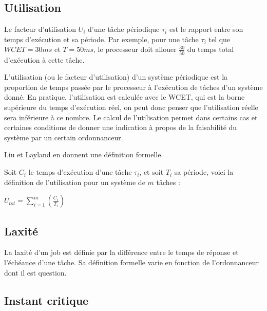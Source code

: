 \documentclass[11pt,a4paper,oneside]{report}
\begin{document}
	\subsection{Utilisation}
	Le facteur d'utilisation $U_i$ d'une tâche périodique $\tau_i$ est le rapport entre 
	son temps d'exécution et sa période. Par exemple, pour une tâche $\tau_i$ tel que 
	$WCET = 30 ms$ et $T = 50 ms$, le processeur doit allouer $\frac{30}{50}$ du temps 
	total d'exécution à cette tâche.\medskip
	
	L'utilisation (ou le facteur d'utilisation) d'un système périodique est la proportion de temps 
	passée par le processeur à l'exécution de tâches d'un système donné. En pratique, l'utilisation 
	est calculée avec le WCET, qui est la borne supérieure du temps d'exécution réel, on 
	peut donc penser que l'utilisation réelle sera inférieure à ce nombre.
	Le calcul de l'utilisation permet dans certains cas et certaines conditions de donner une indication 
	à propos de la faisabilité du système par un certain ordonnanceur. 
	\medskip
	
	Liu et Layland \cite{liu_scheduling_1973} en donnent une définition formelle.\medskip 
	
	Soit $C_i$ le temps d'exécution d'une tâche $\tau_i$, et soit $T_i$ sa période, voici la définition de 
	l'utilisation pour un système de $m$ tâches :\medskip
	\begin{center}
		$U_{tot} = \sum_{i = 1}^{m}(\frac{C_i}{T_i})$
	\end{center}
	
	\subsection{Laxité}
	La laxité d'un job est définie par la différence entre le temps de réponse et l'échéance 
	d'une tâche. Sa définition formelle varie en fonction de l'ordonnanceur dont il est question.
	
	\subsection{Instant critique}
	
	
\end{document}
